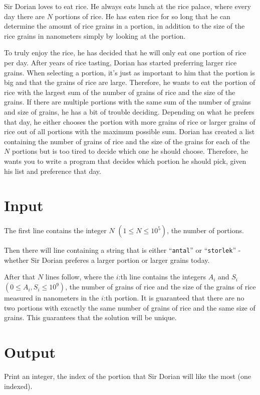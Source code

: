 \noindent
Sir Dorian loves to eat rice. 
He always eats lunch at the rice palace, where every day there are $N$ portions of rice.
He has eaten rice for so long that he can determine the amount of rice grains in a portion, in addition to the size of the rice grains in nanometers simply by looking at the portion.

\noindent
To truly enjoy the rice, he has decided that he will only eat one portion of rice per day. 
After years of rice tasting, Dorian has started preferring larger rice grains. When selecting a portion, it's just as important to him that the portion is big and that the grains of rice are large.
Therefore, he wants to eat the portion of rice with the largest sum of the number of grains of rice and the size of the grains.
If there are multiple portions with the same sum of the number of grains and size of grains, he has a bit of trouble deciding.
Depending on what he prefers that day, he either chooses the portion with more grains of rice or larger grains of rice out of all portions with the maximum possible sum.
Dorian has created a list containing the number of grains of rice and the size of the grains for each of the $N$ portions but is too tired to decide which one he should choose.
Therefore, he wants you to write a program that decides which portion he should pick, given his list and preference that day.

\section*{Input}
\noindent
The first line contains the integer $N$ $(1 \leq N \leq 10^5)$, the number of portions.

\noindent
Then there will line containing a string that is either ``\texttt{antal}'' or ``\texttt{storlek}'' - whether Sir Dorian preferes a larger portion or larger grains today.

\noindent
After that $N$ lines follow, where the $i$:th line contains the integers $A_i$ and $S_i$ $(0 \leq A_i, S_i \leq 10^9)$, the number of grains of rice and the size of the grains of rice measured in nanometers in the $i$:th portion.
It is guaranteed that there are no two portions with excactly the same number of grains of rice and the same size of grains. This guarantees that the solution will be unique.

\section*{Output}
\noindent
Print an integer, the index of the portion that Sir Dorian will like the most (one indexed).

